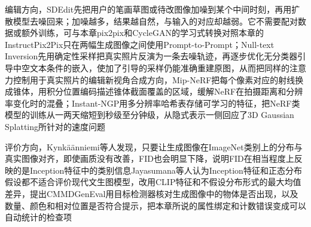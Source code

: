 编辑方向，SDEdit先把用户的笔画草图或待改图像加噪到某个中间时刻，再用扩散模型去噪回来；加噪越多，结果越自然，与输入的对应却越弱。它不需要配对数据或额外训练，可与本章pix2pix和CycleGAN的学习式转换对照本章的InstructPix2Pix只在两幅生成图像之间使用Prompt-to-Prompt；Null-text Inversion先用确定性采样把真实照片反演为一条去噪轨迹，再逐步优化无分类器引导中空文本条件的嵌入，使加了引导的采样仍能准确重建原图，从而把同样的注意力控制用于真实照片的编辑新视角合成方向，Mip-NeRF把每个像素对应的射线换成锥体，用积分位置编码描述锥体截面覆盖的区域，缓解NeRF在拍摄距离和分辨率变化时的混叠；Instant-NGP用多分辨率哈希表存储可学习的特征，把NeRF类模型的训练从一两天缩短到秒级至分钟级，从隐式表示一侧回应了3D Gaussian Splatting所针对的速度问题

评价方向，Kynkäänniemi等人发现，只要让生成图像在ImageNet类别上的分布与真实图像对齐，即使画质没有改善，FID也会明显下降，说明FID在相当程度上反映的是Inception特征中的类别信息Jayasumana等人认为Inception特征和正态分布假设都不适合评价现代文生图模型，改用CLIP特征和不假设分布形式的最大均值差异，提出CMMDGenEval用目标检测器核对生成图像中的物体是否出现，以及数量、颜色和相对位置是否符合提示，把本章所说的属性绑定和计数错误变成可以自动统计的检查项
